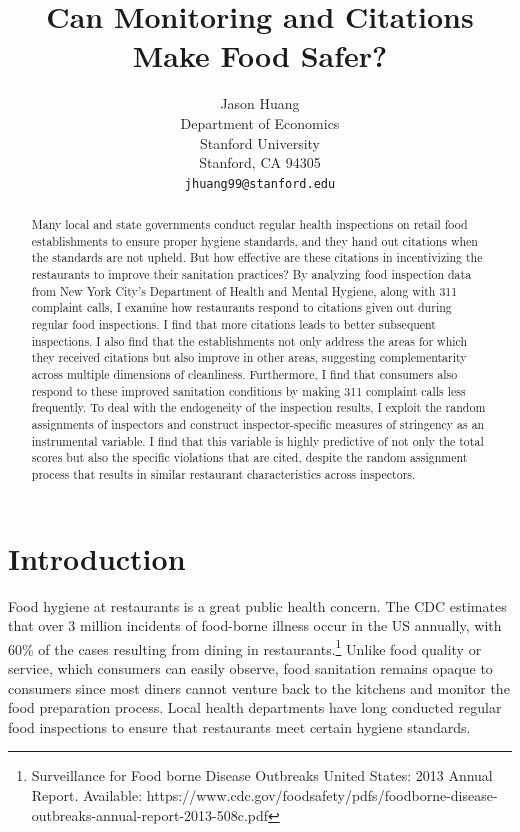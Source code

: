 \documentclass[10pt]{article} %
\title{Can Monitoring and Citations Make Food Safer?}
\author{
Jason Huang \\
Department of Economics\\
Stanford University\\
Stanford, CA 94305 \\
\texttt{jhuang99@stanford.edu} \\
}
\begin{document}
\maketitle

\begin{abstract}

Many local and state governments conduct regular health inspections on retail food establishments to ensure proper hygiene standards, and they hand out citations when the standards are not upheld. But how effective are these citations in incentivizing the restaurants to improve their sanitation practices? By analyzing food inspection data from New York City's Department of Health and Mental Hygiene, along with 311 complaint calls, I examine how restaurants respond to citations given out during regular food inspections. I find that more citations leads to better subsequent inspections. I also find that the establishments not only address the areas for which they received citations but also improve in other areas, suggesting complementarity across multiple dimensions of cleanliness. Furthermore, I find that consumers also respond to these improved sanitation conditions by making 311 complaint calls less frequently. To deal with the endogeneity of the inspection results, I exploit the random assignments of inspectors and construct inspector-specific measures of stringency as an instrumental variable. I find that this variable is highly predictive of not only the total scores but also the specific violations that are cited, despite the random assignment process that results in similar restaurant characteristics across inspectors. 

\end{abstract}

\section{Introduction}

Food hygiene at restaurants is a great public health concern. The CDC estimates that over 3 million incidents of food-borne illness occur in the US annually, with 60\% of the cases resulting from  dining in restaurants.\footnote{Surveillance for Food borne Disease Outbreaks United States: 2013 Annual Report. Available: https://www.cdc.gov/foodsafety/pdfs/foodborne-disease-outbreaks-annual-report-2013-508c.pdf} Unlike food quality or service, which consumers can easily observe, food sanitation remains opaque to consumers since most diners cannot venture back to the kitchens and monitor the food preparation process. Local health departments have long conducted regular food inspections to ensure that restaurants meet certain hygiene standards. 
\end{document}
